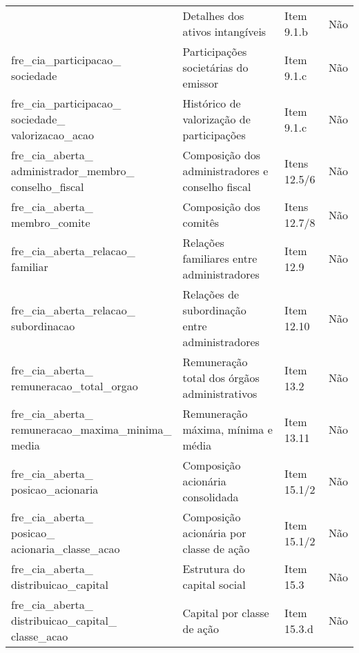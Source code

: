 \documentclass[recuosum=1.5cm]{iftex2024}
\begin{document}
\begin{longtable}{p{5cm} p{5cm} p{2.5cm} p{2cm}}
	\makecell[l]{fre\_cia\_ativo\_intangivel} & Detalhes dos ativos intangíveis & Item 9.1.b & Não \\
	\makecell[l]{fre\_cia\_participacao\_\\sociedade} & Participações societárias do emissor & Item 9.1.c & Não \\
	\makecell[l]{fre\_cia\_participacao\_\\sociedade\_\\valorizacao\_acao} & Histórico de valorização de participações & Item 9.1.c & Não \\
	\makecell[l]{fre\_cia\_aberta\_\\administrador\_membro\_\\conselho\_fiscal} & Composição dos administradores e conselho fiscal & Itens 12.5/6 & Não \\
	\makecell[l]{fre\_cia\_aberta\_\\membro\_comite} & Composição dos comitês & Itens 12.7/8 & Não \\
	\makecell[l]{fre\_cia\_aberta\_relacao\_\\familiar} & Relações familiares entre administradores & Item 12.9 & Não \\
	\makecell[l]{fre\_cia\_aberta\_relacao\_\\subordinacao} & Relações de subordinação entre administradores & Item 12.10 & Não \\
	\makecell[l]{fre\_cia\_aberta\_\\remuneracao\_total\_orgao} & Remuneração total dos órgãos administrativos & Item 13.2 & Não \\
	\makecell[l]{fre\_cia\_aberta\_\\remuneracao\_maxima\_minima\_\\media} & Remuneração máxima, mínima e média & Item 13.11 & Não \\
	\makecell[l]{fre\_cia\_aberta\_\\posicao\_acionaria} & Composição acionária consolidada & Item 15.1/2 & Não \\
	\makecell[l]{fre\_cia\_aberta\_\\posicao\_\\acionaria\_classe\_acao} & Composição acionária por classe de ação & Item 15.1/2 & Não \\
	\makecell[l]{fre\_cia\_aberta\_\\distribuicao\_capital} & Estrutura do capital social & Item 15.3 & Não \\
	\makecell[l]{fre\_cia\_aberta\_\\distribuicao\_capital\_\\classe\_acao} & Capital por classe de ação & Item 15.3.d & Não \\

\end{longtable}
\end{document}
